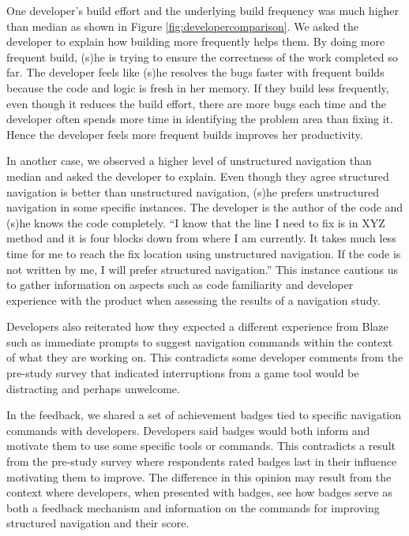 \documentclass{sig-alternate}
\begin{document}
One developer's build effort and the underlying build frequency was much higher than median as shown in Figure \ref{fig:developercomparison}.  We asked the developer to explain how building more frequently helps them. By doing more frequent build, (s)he is trying to ensure the correctness of the work completed so far. The developer feels like (s)he resolves the bugs faster with frequent builds because the code and logic is fresh in her memory. If they build less frequently, even though it reduces the build effort, there are more bugs each time and the developer often spends more time in identifying the problem area than fixing it. Hence the developer feels more frequent builds improves her productivity.  

In another case, we observed a higher level of unstructured navigation than median and asked the developer to explain.  Even though they agree  structured navigation is better than unstructured navigation, (s)he prefers unstructured navigation in some specific instances. The developer is the author of the code and (s)he knows the code completely. ``I know that the line I need to fix is in XYZ method and it is four blocks down from where I am currently. It takes much less time for me to reach the fix location using unstructured navigation. If the code is not written by me, I will prefer structured navigation.'' This instance cautions us to gather information on aspects such as code familiarity and developer experience with the product when assessing the results of a navigation study.

Developers also reiterated how they expected a different experience from Blaze  such as immediate prompts to suggest navigation commands within the context of what they are working on.  This contradicts some developer comments from the pre-study survey that indicated interruptions from a game tool would be distracting and perhaps unwelcome.

In the feedback, we shared a set of achievement badges tied to specific navigation commands with developers.   Developers said badges would both inform and motivate them to use some specific tools or commands.   This contradicts a result from the pre-study survey where respondents rated badges last in their influence motivating them to improve.  The difference in this opinion may result from the context where developers, when presented with badges, see how badges serve as both a feedback mechanism and information on the commands for improving structured navigation and their score.
\end{document}
